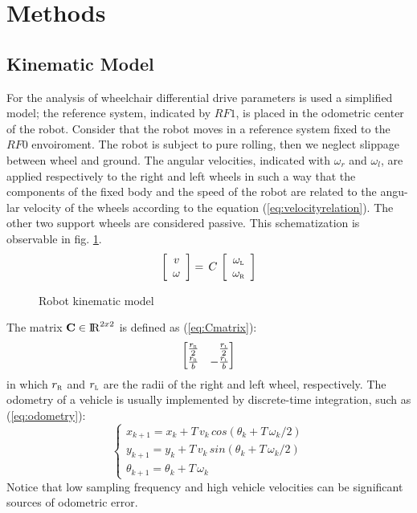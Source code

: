 \section{Methods}
\subsection{Kinematic Model}
For the analysis of wheelchair differential drive parameters is used a simplified model; the reference system, indicated by $RF1$, is placed in the odometric center of the robot. Consider that the robot moves in a reference system fixed to the $RF0$ envoiroment. The robot is subject to pure rolling, then we neglect slippage between wheel and ground. The angular velocities, indicated with $\omega_r$ and $\omega_l$, are applied respectively to the right and left wheels in such a way that the components of the fixed body and the speed of the robot are related to the angu- lar velocity of the wheels according to the equation (\ref{eq:velocityrelation}). The other two support wheels are considered passive. This schematization is observable in fig. \ref{fig:model}.
\begin{equation}
\label{eq:velocityrelation}
	\left[ \begin{array}{cc}
				v	\\									
				\omega 							
			 \end{array} 
	\right]  =\, C\,
	\left[ \begin{array}{cc}
 				\omega_\textsc{l} \\ 
				\omega_\textsc{r}
			 \end{array} 
	\right]
\end{equation}

\begin{figure}[!h]
\centering
    \resizebox{.8\linewidth}{!}{}
\caption{Robot kinematic model}
\label{fig:model}
\end{figure}
\noindent The matrix $\textbf{C} \in \operatorname{\rm I\!R}^{2 x 2}$ is defined as (\ref{eq:Cmatrix}):
\begin{equation}
\label{eq:Cmatrix}
	\begin{bmatrix*}[r]
		\frac{r_\textsc{r}}{2} &	\frac{r_\textsc{l}}{2} \\
		\frac{r_\textsc{r}}{b} &	-\frac{r_\textsc{l}}{b} 
	\end{bmatrix*}
\end{equation}
in which $r_\textsc{r}$ and $r_\textsc{l}$ are the radii of the right and left wheel, respectively.
The odometry of a vehicle is usually implemented by discrete-time integration, such as (\ref{eq:odometry}):
\begin{equation}
\label{eq:odometry}
	\begin{cases}
		x_{k+1} = x_{k} + T \, v_{k} \, cos(\theta_{k} + T \,\omega_{k}/2)\\
		y_{k+1} = y_{k} + T \, v_{k} \, sin(\theta_{k} + T \, \omega_{k}/2)\\
		\theta_{k+1} = \theta_{k} + T \, \omega_{k}
	\end{cases}
\end{equation}
Notice that low sampling frequency and high vehicle velocities can be significant sources of odometric error.

